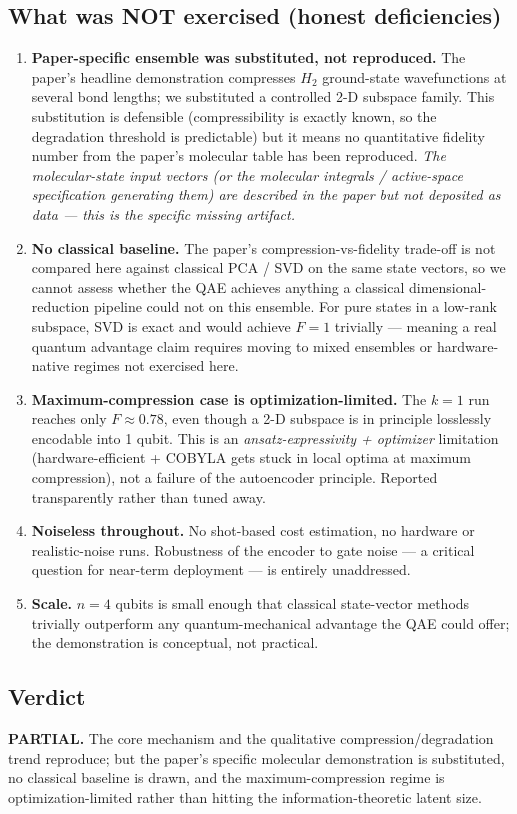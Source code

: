 \documentclass[11pt]{article}
\begin{document}
\subsection*{What was NOT exercised (honest deficiencies)}
\begin{enumerate}
  \item \textbf{Paper-specific ensemble was substituted, not reproduced.} The
        paper's headline demonstration compresses $H_2$ ground-state
        wavefunctions at several bond lengths; we substituted a controlled 2-D
        subspace family. This substitution is defensible (compressibility is
        exactly known, so the degradation threshold is predictable) but it means
        no quantitative fidelity number from the paper's molecular table has
        been reproduced. \emph{The molecular-state input vectors (or the
        molecular integrals / active-space specification generating them) are
        described in the paper but not deposited as data --- this is the
        specific missing artifact.}
  \item \textbf{No classical baseline.} The paper's compression-vs-fidelity
        trade-off is not compared here against classical PCA / SVD on the same
        state vectors, so we cannot assess whether the QAE achieves anything a
        classical dimensional-reduction pipeline could not on this ensemble.
        For pure states in a low-rank subspace, SVD is exact and would achieve
        $F = 1$ trivially --- meaning a real quantum advantage claim requires
        moving to mixed ensembles or hardware-native regimes not exercised
        here.
  \item \textbf{Maximum-compression case is optimization-limited.} The $k=1$
        run reaches only $F \approx 0.78$, even though a 2-D subspace is in
        principle losslessly encodable into 1 qubit. This is an
        \emph{ansatz-expressivity + optimizer} limitation (hardware-efficient +
        COBYLA gets stuck in local optima at maximum compression), not a
        failure of the autoencoder principle. Reported transparently rather
        than tuned away.
  \item \textbf{Noiseless throughout.} No shot-based cost estimation, no
        hardware or realistic-noise runs. Robustness of the encoder to gate
        noise --- a critical question for near-term deployment --- is entirely
        unaddressed.
  \item \textbf{Scale.} $n = 4$ qubits is small enough that classical
        state-vector methods trivially outperform any quantum-mechanical
        advantage the QAE could offer; the demonstration is conceptual, not
        practical.
\end{enumerate}

\subsection*{Verdict}
\textbf{PARTIAL.} The core mechanism and the qualitative
compression/degradation trend reproduce; but the paper's specific molecular
demonstration is substituted, no classical baseline is drawn, and the
maximum-compression regime is optimization-limited rather than hitting the
information-theoretic latent size.


\end{document}
